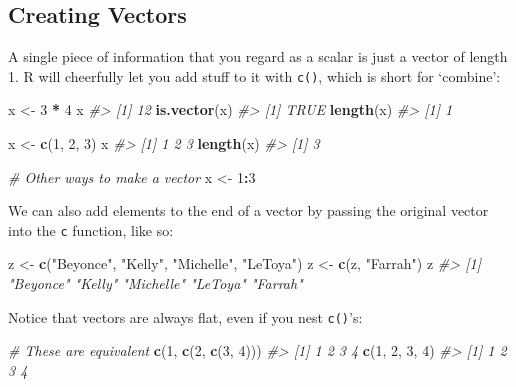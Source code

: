 \documentclass[
]{book}
\newenvironment{Shaded}{\begin{snugshade}}{\end{snugshade}}
\newcommand{\CommentTok}[1]{\textcolor[rgb]{0.56,0.35,0.01}{\textit{#1}}}
\newcommand{\DecValTok}[1]{\textcolor[rgb]{0.00,0.00,0.81}{#1}}
\newcommand{\KeywordTok}[1]{\textcolor[rgb]{0.13,0.29,0.53}{\textbf{#1}}}
\newcommand{\NormalTok}[1]{#1}
\newcommand{\OperatorTok}[1]{\textcolor[rgb]{0.81,0.36,0.00}{\textbf{#1}}}
\newcommand{\StringTok}[1]{\textcolor[rgb]{0.31,0.60,0.02}{#1}}
\begin{document}
\hypertarget{creating-vectors}{%
\subsection{Creating Vectors}\label{creating-vectors}}

A single piece of information that you regard as a scalar is just a vector of length 1. R will cheerfully let you add stuff to it with \texttt{c()}, which is short for `combine':

\begin{Shaded}
\begin{Highlighting}[]
\NormalTok{x <-}\StringTok{ }\DecValTok{3} \OperatorTok{*}\StringTok{ }\DecValTok{4}
\NormalTok{x}
\CommentTok{#> [1] 12}
\KeywordTok{is.vector}\NormalTok{(x)}
\CommentTok{#> [1] TRUE}
\KeywordTok{length}\NormalTok{(x)}
\CommentTok{#> [1] 1}

\NormalTok{x <-}\StringTok{ }\KeywordTok{c}\NormalTok{(}\DecValTok{1}\NormalTok{, }\DecValTok{2}\NormalTok{, }\DecValTok{3}\NormalTok{)}
\NormalTok{x}
\CommentTok{#> [1] 1 2 3}
\KeywordTok{length}\NormalTok{(x)}
\CommentTok{#> [1] 3}

\CommentTok{# Other ways to make a vector}
\NormalTok{x <-}\StringTok{ }\DecValTok{1}\OperatorTok{:}\DecValTok{3}
\end{Highlighting}
\end{Shaded}

We can also add elements to the end of a vector by passing the original vector into the \texttt{c} function, like so:

\begin{Shaded}
\begin{Highlighting}[]
\NormalTok{z <-}\StringTok{ }\KeywordTok{c}\NormalTok{(}\StringTok{"Beyonce"}\NormalTok{, }\StringTok{"Kelly"}\NormalTok{, }\StringTok{"Michelle"}\NormalTok{, }\StringTok{"LeToya"}\NormalTok{)}
\NormalTok{z <-}\StringTok{ }\KeywordTok{c}\NormalTok{(z, }\StringTok{"Farrah"}\NormalTok{)}
\NormalTok{z}
\CommentTok{#> [1] "Beyonce"  "Kelly"    "Michelle" "LeToya"   "Farrah"}
\end{Highlighting}
\end{Shaded}

Notice that vectors are always flat, even if you nest \texttt{c()}'s:

\begin{Shaded}
\begin{Highlighting}[]
\CommentTok{# These are equivalent}
\KeywordTok{c}\NormalTok{(}\DecValTok{1}\NormalTok{, }\KeywordTok{c}\NormalTok{(}\DecValTok{2}\NormalTok{, }\KeywordTok{c}\NormalTok{(}\DecValTok{3}\NormalTok{, }\DecValTok{4}\NormalTok{)))}
\CommentTok{#> [1] 1 2 3 4}
\KeywordTok{c}\NormalTok{(}\DecValTok{1}\NormalTok{, }\DecValTok{2}\NormalTok{, }\DecValTok{3}\NormalTok{, }\DecValTok{4}\NormalTok{)}
\CommentTok{#> [1] 1 2 3 4}
\end{Highlighting}
\end{Shaded}
\end{document}
